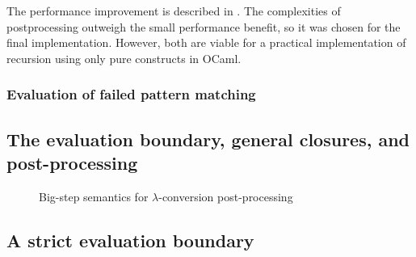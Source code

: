 The performance improvement is described in . The complexities of postprocessing outweigh the small performance benefit, so it was chosen for the final implementation. However, both are viable for a practical implementation of recursion using only pure constructs in OCaml.


\subsubsection{Evaluation of failed pattern matching}
\label{sec:failed_pattern_match}

\subsection{The evaluation boundary, general closures, and post-processing}
\label{sec:closures_to_lambdas}





\begin{figure}
  \centering
  \begin{mdframed}
    \begin{singlespace}
      
    \end{singlespace}
  \end{mdframed}
  \caption{Big-step semantics for $\lambda$-conversion post-processing}
  \label{fig:big-step-inside-formal}
\end{figure}

\subsection{A strict evaluation boundary}
\label{sec:eval_boundary}

